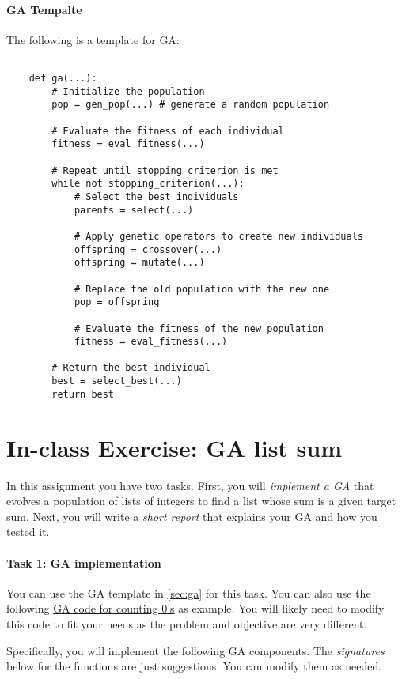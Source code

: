 \documentclass[oneside,11pt,dvipsnames]{book}
\begin{document}
\paragraph{GA Tempalte} The following is a template for GA:
\begin{lstlisting}

    def ga(...):
        # Initialize the population
        pop = gen_pop(...) # generate a random population

        # Evaluate the fitness of each individual
        fitness = eval_fitness(...)

        # Repeat until stopping criterion is met
        while not stopping_criterion(...):
            # Select the best individuals
            parents = select(...)
            
            # Apply genetic operators to create new individuals
            offspring = crossover(...)
            offspring = mutate(...)
            
            # Replace the old population with the new one
            pop = offspring

            # Evaluate the fitness of the new population
            fitness = eval_fitness(...)
            
        # Return the best individual
        best = select_best(...)
        return best
\end{lstlisting}

\section{In-class Exercise: GA list sum}\label{exercise:list-sum-ga}
In this assignment you have two tasks. First, you will \emph{implement a GA} that evolves a population of lists of integers to find a list whose sum is a given target sum. Next, you will write a \emph{short report} that explains your GA and how you tested it.

\paragraph{Task 1: GA implementation}

 You can use the GA template in \autoref{sec:ga} for this task. You can also use the following \href{https://nguyenthanhvuh.github.io/class-oo/ga-example.py}{GA code for counting 0's} as example. You will likely need to modify this code to fit your needs as the problem and objective are very different.
 
 
 Specifically, you will implement the following GA components. The \emph{signatures} below for the functions are just suggestions. You can modify them as needed.
\end{document}
